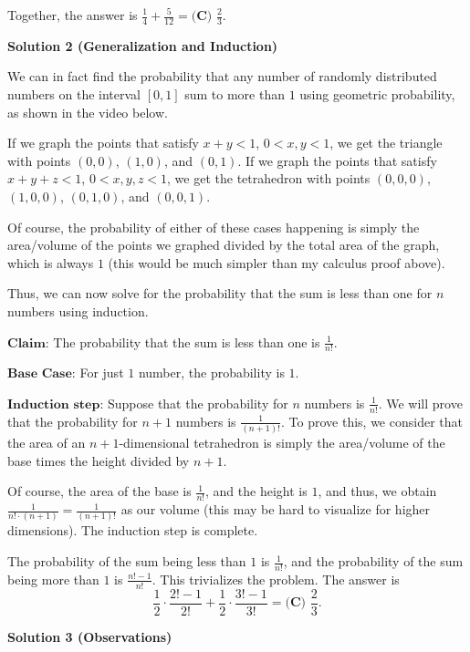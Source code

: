 \begin{enumerate}
\begin{enumerate}
            \end{enumerate}
            Together, the answer is $\frac14 + \frac{5}{12} = \boxed{\textbf{(C) }\frac{2}{3}}.$




\textbf{Solution 2 (Generalization and Induction)}

We can in fact find the probability that any number of randomly distributed numbers on the interval $[0, 1]$ sum to more than $1$ using geometric probability, as shown in the video below.

 If we graph the points that satisfy $x + y < 1$, $0 < x, y < 1$, we get the triangle with points $(0, 0)$, $(1, 0)$, and $(0, 1)$. If we graph the points that satisfy $x + y + z < 1$, $0 < x, y, z < 1$, we get the tetrahedron with points $(0, 0, 0)$, $(1, 0, 0)$, $(0, 1, 0)$, and $(0, 0, 1)$.

 Of course, the probability of either of these cases happening is simply the area/volume of the points we graphed divided by the total area of the graph, which is always $1$ (this would be much simpler than my calculus proof above).

 Thus, we can now solve for the probability that the sum is less than one for $n$ numbers using induction.

 $\textbf{Claim:}$ The probability that the sum is less than one is $\frac{1}{n!}$.

 $\textbf{Base Case:}$ For just $1$ number, the probability is $1$.

 $\textbf{Induction step:}$ Suppose that the probability for $n$ numbers is $\frac{1}{n!}$. We will prove that the probability for $n+1$ numbers is $\frac{1}{(n+1)!}$. To prove this, we consider that the area of an $n+1$-dimensional tetrahedron is simply the area/volume of the base times the height divided by $n+1$. 

 Of course, the area of the base is $\frac{1}{n!}$, and the height is $1$, and thus, we obtain $\frac{1}{n! \cdot (n+1)} = \frac{1}{(n+1)!}$ as our volume (this may be hard to visualize for higher dimensions). The induction step is complete.

 The probability of the sum being less than $1$ is $\frac{1}{n!}$, and the probability of the sum being more than $1$ is $\frac{n!-1}{n!}$. This trivializes the problem. The answer is 
 \[\frac{1}{2} \cdot \frac{2! - 1}{2!} + \frac{1}{2} \cdot \frac{3! - 1}{3!} = \boxed{\textbf{(C) }\frac{2}{3}}.\]




\textbf{Solution 3 (Observations)}


\end{enumerate}
